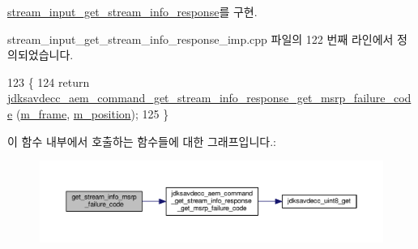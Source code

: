 \hyperlink{classavdecc__lib_1_1stream__input__get__stream__info__response_ac6de72a4fceb3b08ac797689cd04c213}{stream\+\_\+input\+\_\+get\+\_\+stream\+\_\+info\+\_\+response}를 구현.



stream\+\_\+input\+\_\+get\+\_\+stream\+\_\+info\+\_\+response\+\_\+imp.\+cpp 파일의 122 번째 라인에서 정의되었습니다.


\begin{DoxyCode}
123 \{
124     \textcolor{keywordflow}{return} \hyperlink{group__command__get__stream__info__response_gafe1f00653ff44ce4d64da0d4a93afb91}{jdksavdecc\_aem\_command\_get\_stream\_info\_response\_get\_msrp\_failure\_code}
      (\hyperlink{classavdecc__lib_1_1stream__input__get__stream__info__response__imp_a50417969cf438e7c8d698726bbbe2ff9}{m\_frame}, \hyperlink{classavdecc__lib_1_1stream__input__get__stream__info__response__imp_af5e691c4a8a0feb07f48440b321206cd}{m\_position});
125 \}
\end{DoxyCode}


이 함수 내부에서 호출하는 함수들에 대한 그래프입니다.\+:
\nopagebreak
\begin{figure}[H]
\begin{center}
\leavevmode
\includegraphics[width=350pt]{classavdecc__lib_1_1stream__input__get__stream__info__response__imp_ae1309302604fdeaf7482693e3787c4f7_cgraph}
\end{center}
\end{figure}


